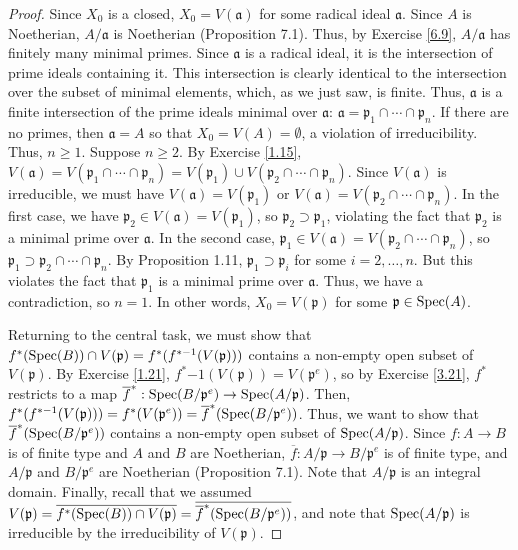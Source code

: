 \begin{proof}
Since $X_0$ is a closed, $X_0 = V(\mathfrak{a})$ for some radical ideal $\mathfrak{a}$. Since $A$ is Noetherian, $A/\mathfrak{a}$ is Noetherian (Proposition 7.1).
Thus, by Exercise \ref{6.9}, $A/\mathfrak{a}$ has finitely many minimal primes. Since $\mathfrak{a}$ is a radical ideal, it is the intersection of prime ideals
containing it. This intersection is clearly identical to the intersection over the subset of minimal elements, which, as we just saw, is finite. Thus, $\mathfrak{a}$
is a finite intersection of the prime ideals minimal over $\mathfrak{a}$: $\mathfrak{a} = \mathfrak{p}_1 \cap \cdots \cap \mathfrak{p}_n$. If there are no primes, 
then $\mathfrak{a} = A$ so that $X_0 = V(A) = \emptyset$, a violation of irreducibility. Thus, $n \ge 1$. Suppose $n \ge 2$. By Exercise \ref{1.15},
$V(\mathfrak{a}) = V(\mathfrak{p}_1 \cap \cdots \cap \mathfrak{p}_n) = V(\mathfrak{p}_1) \cup V(\mathfrak{p}_2 \cap \cdots \cap \mathfrak{p}_n)$. Since $V(\mathfrak{a})$
is irreducible, we must have $V(\mathfrak{a}) = V(\mathfrak{p}_1)$ or $V(\mathfrak{a}) = V(\mathfrak{p}_2 \cap \cdots \cap \mathfrak{p}_n)$. In the first case, we have
$\mathfrak{p}_2 \in V(\mathfrak{a}) = V(\mathfrak{p}_1)$, so $\mathfrak{p}_2 \supset \mathfrak{p}_1$, violating the fact that $\mathfrak{p}_2$ is a minimal prime
over $\mathfrak{a}$. In the second case, $\mathfrak{p}_1 \in V(\mathfrak{a}) = V(\mathfrak{p}_2 \cap \cdots \cap \mathfrak{p}_n)$, so 
$\mathfrak{p}_1 \supset \mathfrak{p}_2 \cap \cdots \cap \mathfrak{p}_n$. By Proposition 1.11, $\mathfrak{p}_1 \supset \mathfrak{p}_i$ for some $i = 2,\ldots,n$.
But this violates the fact that $\mathfrak{p}_1$ is a minimal prime over $\mathfrak{a}$. Thus, we have a contradiction, so $n=1$. In other words, $X_0 = V(\mathfrak{p})$
for some $\mathfrak{p} \in \operatorname{Spec}(A)$.

Returning to the central task, we must show that $f^*(\operatorname{Spec}(B)) \cap V(\mathfrak{p}) = f^*(f^{*-1}(V(\mathfrak{p})))$ contains a non-empty open subset of $V(\mathfrak{p})$.
By Exercise \ref{1.21}, $f^*{-1}(V(\mathfrak{p})) = V(\mathfrak{p}^e)$, so by Exercise \ref{3.21}, $f^*$ restricts to a map
$\overline{f}^* : \operatorname{Spec}(B/\mathfrak{p}^e) \to \operatorname{Spec}(A/\mathfrak{p})$. Then, $f^*(f^{*-1}(V(\mathfrak{p}))) = f^*(V(\mathfrak{p}^e)) = \overline{f}^*(\operatorname{Spec}(B/\mathfrak{p}^e))$.
Thus, we want to show that $\overline{f}^*(\operatorname{Spec}(B/\mathfrak{p}^e))$ contains a non-empty open subset of $\operatorname{Spec}(A/\mathfrak{p})$. Since $f : A \to B$ is of finite type
and $A$ and $B$ are Noetherian, $\overline{f} : A/\mathfrak{p} \to B/\mathfrak{p}^e$ is of finite type, and $A/\mathfrak{p}$ and $B/\mathfrak{p}^e$ are Noetherian
(Proposition 7.1). Note that $A/\mathfrak{p}$ is an integral domain. Finally, recall that we assumed $V(\mathfrak{p}) = \overline{f^*(\operatorname{Spec}(B)) \cap V(\mathfrak{p})}
= \overline{\overline{f}^*(\operatorname{Spec}(B/\mathfrak{p}^e))}$, and note that $\operatorname{Spec}(A/\mathfrak{p})$ is irreducible by the irreducibility of $V(\mathfrak{p})$.


\end{proof}
